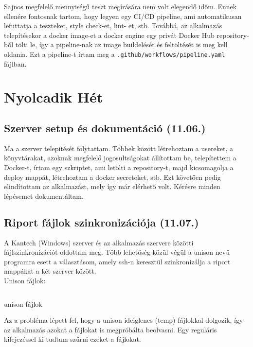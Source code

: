 \documentclass[a4paper]{article}
\newcommand{\inltxt}[1]{\texttt{#1}}
\begin{document}
Sajnos megfelelő mennyiségű teszt megírására nem volt elegendő időm. Ennek ellenére fontosnak
tartom, hogy legyen egy CI/CD pipeline, ami automatikusan lefuttatja a teszteket, style check-et, lint-
et, stb. Továbbá, az alkalmazás telepítésekor a docker image-et a docker engine egy privát Docker Hub
repository-ból tölti le, így a pipeline-nak az image buildelését és feltöltését is meg kell oldania. Ezt a
pipeline-t írtam meg a \inltxt{.github/workflows/pipeline.yaml} fájlban.

\section{Nyolcadik Hét}

\subsection{Szerver setup és dokumentáció (11.06.)}

Ma a szerver telepítését folytattam. Többek között létrehoztam a usereket, a könyvtárakat, azoknak
megfelelő jogosultságokat állítottam be, telepítettem a Docker-t, írtam egy szkriptet, ami letölti a
repository-t, majd kicsomagolja a deploy mappát, létrehoztam a docker secreteket, stb. Ezt követően
pedig elindítottam az alkalmazást, mely így már elérhető volt. Kérésre minden lépésemet
dokumentáltam.

\subsection{Riport fájlok szinkronizációja (11.07.)}

A Kantech (Windows) szerver és az alkalmazás szervere közötti fájlszinkronizációt oldottam meg. Több
lehetőség közül végül a unison nevű programra esett a választásom, amely ssh-n keresztül
szinkronizálja a riport mappákat a két szerver között. \\

Unison fájlok:

\begin{listing}[!ht]
\inputminted[bgcolor=codebg, breaklines, breakanywhere, fontsize=\small]{text}{code/unison-files.prf}
\caption{unison fájlok}
\label{listing:12}
\end{listing}

Az a probléma lépett fel, hogy a unison ideiglenes (temp) fájlokkal dolgozik, így az alkalmazás azokat
a fájlokat is megpróbálta beolvasni. Egy reguláris kifejezéssel ki tudtam szűrni ezeket a fájlokat.\\
\end{document}
